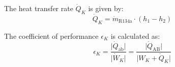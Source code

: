 The heat transfer rate \( \dot{Q}_K \) is given by:  
\[
\dot{Q}_K = \dot{m}_{\text{R134a}} \cdot (h_1 - h_2)
\]  

The coefficient of performance \( \epsilon_K \) is calculated as:  
\[
\epsilon_K = \frac{\lvert \dot{Q}_{\text{ab}} \rvert}{\lvert \dot{W}_K \rvert} = \frac{\lvert \dot{Q}_{\text{AB}} \rvert}{\lvert W_K + \dot{Q}_K \rvert}
\]